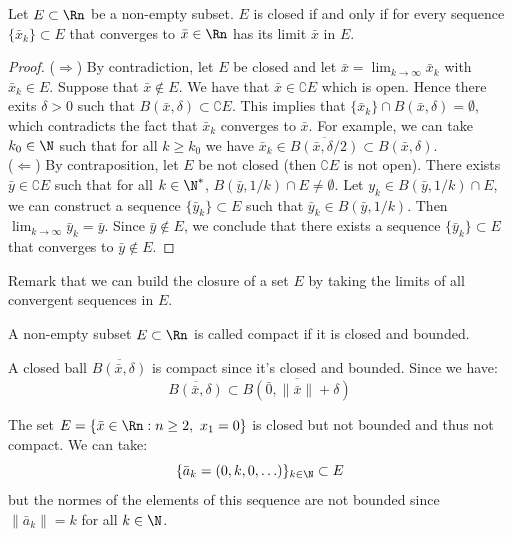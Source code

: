 \begin{theorem}
    Let $E \subset \Rn$ be a non-empty subset. $E$ is closed if and only if for every sequence $\{\bar{x}_k\} \subset E$ that converges to $\bar{x} \in \Rn$ has its limit $\bar{x}$ in $E$.
\end{theorem}
\begin{proof}
    ($\Rightarrow$) By contradiction, let $E$ be closed and let $\bar{x} = \lim_{k \to \infty} \bar{x}_k$ with $\bar{x}_k \in E$. Suppose that $\bar{x} \notin E$. We have that $\bar{x} \in \complement E$ which is open. Hence there exits $\delta > 0$ such that $B(\bar{x}, \delta) \subset \complement E$. This implies that $\{\bar{x}_k\} \cap B(\bar{x}, \delta) = \emptyset$, which contradicts the fact that $\bar{x}_k$ converges to $\bar{x}$. For example, we can take $k_0 \in \N$ such that for all $k \geq k_0$ we have $\bar{x}_k \in \overline{B(\bar{x}, \delta / 2)} \subset B(\bar{x}, \delta)$. \\
    ($\Leftarrow$) By contraposition, let $E$ be not closed (then $\complement E$ is not open). There exists $\bar{y} \in \complement E$ such that for all $k \in \N^*$, $B(\bar{y}, 1/k) \cap E \neq \emptyset$. Let $y_k \in B(\bar{y}, 1/k) \cap E$, we can construct a sequence $\{\bar{y}_k\} \subset E$ such that $\bar{y}_k \in B(\bar{y}, 1/k)$. Then $\lim_{k \to \infty} \bar{y}_k = \bar{y}$. Since $\bar{y} \notin E$, we conclude that there exists a sequence $\{\bar{y}_k\} \subset E$ that converges to $\bar{y} \notin E$.
\end{proof}
Remark that we can build the closure of a set $E$ by taking the limits of all convergent sequences in $E$.

\begin{definition}
    A non-empty subset $E \subset \Rn$ is called compact if it is closed and bounded.
\end{definition}

\begin{eg}
    A closed ball $\overline{B(\bar{x}, \delta)}$ is compact since it's closed and bounded. Since we have:
    \[
        \overline{B(\bar{x}, \delta)} \subset \overline{B(\bar{0}, \| \bar{x} \| + \delta)} 
    \]
\end{eg}

\begin{eg}
    The set $E = \{\bar{x} \in \Rn : n \geq 2, \ x_1 = 0\}$ is closed but not bounded and thus not compact. We can take:
    \[
        \{\bar{a}_k = (0, k, 0, \ldots)\}_{k \in \N} \subset E
    \]
    but the normes of the elements of this sequence are not bounded since $\|\bar{a}_k\| = k$ for all $k \in \N$.
\end{eg}

